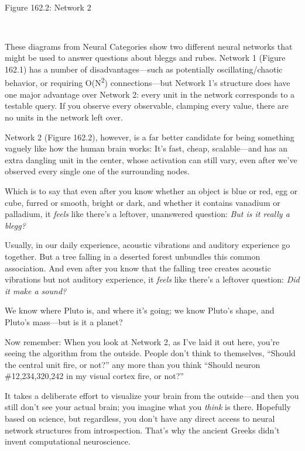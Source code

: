 {
 ~}

{\centering
{}
 \newline
 Figure 162.2: Network 2
\par}


\bigskip

{
 ~}

{
 These diagrams from Neural Categories show two different neural
networks that might be used to answer questions about bleggs and rubes.
Network 1 (Figure 162.1) has a number of disadvantages---such as
potentially oscillating/chaotic behavior, or requiring
O(N\textsuperscript{2}) connections---but Network 1's
structure does have one major advantage over Network 2: every unit in
the network corresponds to a testable query. If you observe every
observable, clamping every value, there are no units in the network
left over.}

{
 Network 2 (Figure 162.2), however, is a far better candidate for
being something vaguely like how the human brain works:
It's fast, cheap, scalable---and has an extra dangling
unit in the center, whose activation can still vary, even after
we've observed every single one of the surrounding
nodes.}

{
 Which is to say that even after you know whether an object is blue
or red, egg or cube, furred or smooth, bright or dark, and whether it
contains vanadium or palladium, it \textit{feels} like
there's a leftover, unanswered question: \textit{But is
it really a blegg?}}

{
 Usually, in our daily experience, acoustic vibrations and auditory
experience go together. But a tree falling in a deserted forest
unbundles this common association. And even after you know that the
falling tree creates acoustic vibrations but not auditory experience,
it \textit{feels} like there's a leftover question:
\textit{Did it make a sound?}}

{
 We know where Pluto is, and where it's going; we
know Pluto's shape, and Pluto's
mass---but is it a planet?}

{
 Now remember: When you look at Network 2, as I've
laid it out here, you're seeing the algorithm from the
outside. People don't think to themselves,
``Should the central unit fire, or
not?'' any more than you think
``Should neuron \#12,234,320,242 in my visual cortex
fire, or not?''}

{
 It takes a deliberate effort to visualize your brain from the
outside---and then you still don't see your actual
brain; you imagine what you \textit{think} is there. Hopefully based on
science, but regardless, you don't have any direct
access to neural network structures from introspection.
That's why the ancient Greeks didn't
invent computational neuroscience.}

